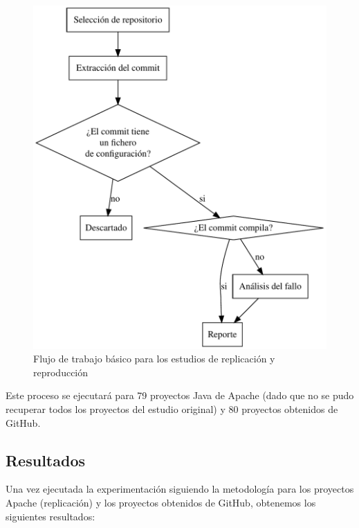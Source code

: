 \begin{figure}[ht!]
    \centering    
    \includegraphics[height=\textwidth]{pages/Appendix/figures/methodology.pdf}
    \caption{Flujo de trabajo básico para los estudios de replicación y reproducción}
    \label{fig:resumen:methodology}
\end{figure}

Este proceso se ejecutará para 79 proyectos Java de Apache (dado que no se pudo recuperar todos los proyectos del estudio original) y 80 proyectos obtenidos de GitHub.

\subsection{Resultados}

Una vez ejecutada la experimentación siguiendo la metodología para los proyectos Apache (replicación) y los proyectos obtenidos de GitHub, obtenemos los siguientes resultados:


